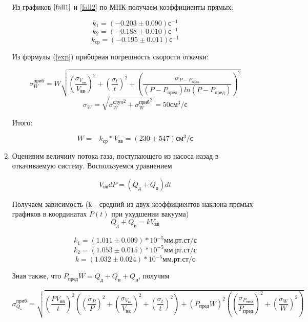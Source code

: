 \documentclass[a4paper,12pt]{article}
\begin{document}
\begin{enumerate}
    Из графиков $\ref{fall1}$ и \ref{fall2} по МНК получаем коэффициенты прямых:

        $$    k_1 = (-0.203 \pm 0.090) \text{с}^{-1}     $$
        $$    k_2 = (-0.188 \pm 0.010) \text{с}^{-1}     $$
        $$    k_{\text{ср}} = (-0.195 \pm 0.011 ) \text{с}^{-1} $$

        Из формулы (\ref{exp}) приборная погрешность скорости откачки:

        $$    \sigma_W^{\text{приб}} = W \sqrt{\left( \frac{\sigma_{V_{\text{вв}}}}{V_{\text{вв}}} \right)^2 + \left( \frac{\sigma_{t}}{t} \right)^2 + \left( \frac{\sigma_{P - P_{\text{пред}}}}{(P - P_{\text{пред}}) ln(P - P_{\text{пред}})} \right)^2}$$
        $$    \sigma_W = \sqrt{{\sigma_W^{\text{случ}}}^2 + {\sigma_W^{\text{приб}}}^2} = 50 \text{см}^3/\text{с} $$

        Итого:

        $$    W = -k_{\text{ср}} * V_{\text{вв}} = (230 \pm 547) \text{см}^3/\text{с} $$

    \item Оценивим величину потока газа, поступающего из насоса назад в откачиваемую систему.
        Воспользуемся уравнением

        $$    V_{\text{вв}} dP = (Q_{\text{д}} + Q_{\text{и}})dt $$

        Получаем зависимость (k - средний из двух коэффициентов наклона прямых графиков в координатах $P(t)$ при ухудшении вакуума)
        $$    Q_{\text{д}} + Q_{\text{и}} = k V_{\text{вв}} $$

        $$    k_1 = (1.011 \pm 0.009) * 10^{-5} \text{мм.рт.ст/с}$$
        $$    k_2 = (1.053 \pm 0.015) * 10^{-5} \text{мм.рт.ст/с}$$
        $$    k = (1.032 \pm 0.024) * 10^{-5}   \text{мм.рт.ст/с} $$

        Зная также, что $P_{\text{пред}}W = Q_{\text{д}} + Q_{\text{и}} + Q_{\text{н}}$, получим

        $$    \sigma_{Q_{\text{н}}}^{приб} = \sqrt{ \left( \frac{P V_{\text{вв}}}{t} \right)^2 \left( \left( \frac{\sigma_P}{P} \right)^2 + \left( \frac{\sigma_{V_{\text{вв}}}}{V_{\text{вв}}} \right)^2 + \left( \frac{\sigma_t}{t} \right)^2 \right) + \left( P_{\text{пред}} W \right)^2 \left( \left( \frac{\sigma_{P_{\text{пред}}}}{P_{\text{пред}}} \right)^2 + \left( \frac{\sigma_W}{W} \right)^2 \right)}$$


\end{enumerate}
\end{document}

